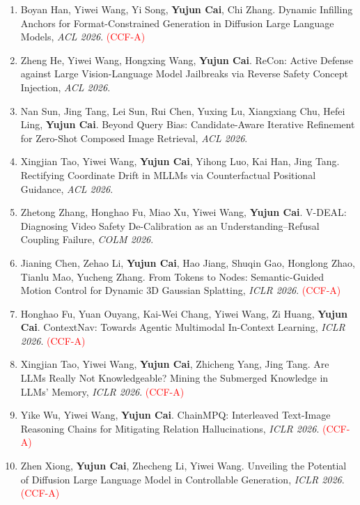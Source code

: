 \documentclass[UTF8,a4paper,11pt,fontset=fandol]{ctexart}
\begin{document}
\begin{enumerate}
\item Boyan Han, Yiwei Wang, Yi Song, \textbf{Yujun Cai}, Chi Zhang. Dynamic Infilling Anchors for Format-Constrained Generation in Diffusion Large Language Models, \textit{ACL 2026}. \textcolor{red}{(CCF-A)}

\item Zheng He, Yiwei Wang, Hongxing Wang, \textbf{Yujun Cai}. ReCon: Active Defense against Large Vision-Language Model Jailbreaks via Reverse Safety Concept Injection, \textit{ACL 2026}.

\item Nan Sun, Jing Tang, Lei Sun, Rui Chen, Yuxing Lu, Xiangxiang Chu, Hefei Ling, \textbf{Yujun Cai}. Beyond Query Bias: Candidate-Aware Iterative Refinement for Zero-Shot Composed Image Retrieval, \textit{ACL 2026}.

\item Xingjian Tao, Yiwei Wang, \textbf{Yujun Cai}, Yihong Luo, Kai Han, Jing Tang. Rectifying Coordinate Drift in MLLMs via Counterfactual Positional Guidance, \textit{ACL 2026}.

\item Zhetong Zhang, Honghao Fu, Miao Xu, Yiwei Wang, \textbf{Yujun Cai}. V-DEAL: Diagnosing Video Safety De-Calibration as an Understanding--Refusal Coupling Failure, \textit{COLM 2026}.

\item Jianing Chen, Zehao Li, \textbf{Yujun Cai}, Hao Jiang, Shuqin Gao, Honglong Zhao, Tianlu Mao, Yucheng Zhang. From Tokens to Nodes: Semantic-Guided Motion Control for Dynamic 3D Gaussian Splatting, \textit{ICLR 2026}. \textcolor{red}{(CCF-A)}

\item Honghao Fu, Yuan Ouyang, Kai-Wei Chang, Yiwei Wang, Zi Huang, \textbf{Yujun Cai}. ContextNav: Towards Agentic Multimodal In-Context Learning, \textit{ICLR 2026}. \textcolor{red}{(CCF-A)}

\item Xingjian Tao, Yiwei Wang, \textbf{Yujun Cai}, Zhicheng Yang, Jing Tang. Are LLMs Really Not Knowledgeable? Mining the Submerged Knowledge in LLMs' Memory, \textit{ICLR 2026}. \textcolor{red}{(CCF-A)}

\item Yike Wu, Yiwei Wang, \textbf{Yujun Cai}. ChainMPQ: Interleaved Text-Image Reasoning Chains for Mitigating Relation Hallucinations, \textit{ICLR 2026}. \textcolor{red}{(CCF-A)}

\item Zhen Xiong, \textbf{Yujun Cai}, Zhecheng Li, Yiwei Wang. Unveiling the Potential of Diffusion Large Language Model in Controllable Generation, \textit{ICLR 2026}. \textcolor{red}{(CCF-A)}


\end{enumerate}
\end{document}
